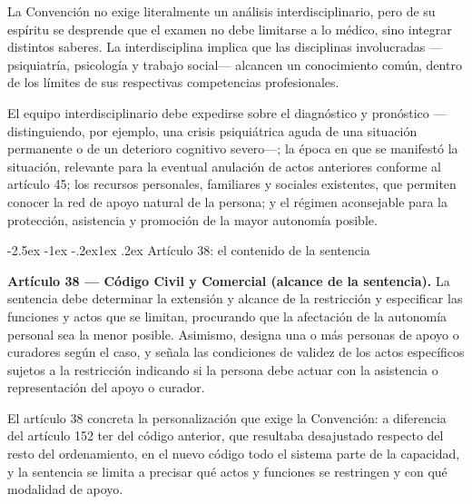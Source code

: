 \documentclass[12pt,oneside]{book}
\makeatletter
\renewcommand\subsection{\@startsection{subsection}{2}{\z@}%
  {-2.5ex \@plus -1ex \@minus -.2ex}{1ex \@plus .2ex}%
  {\normalfont\normalsize\bfseries}}
\makeatother
\begin{document}
La Convención no exige literalmente un análisis interdisciplinario, pero de su espíritu se desprende que el examen no debe limitarse a lo médico, sino integrar distintos saberes. La interdisciplina implica que las disciplinas involucradas ---psiquiatría, psicología y trabajo social--- alcancen un conocimiento común, dentro de los límites de sus respectivas competencias profesionales.


El equipo interdisciplinario debe expedirse sobre el diagnóstico y pronóstico ---distinguiendo, por ejemplo, una crisis psiquiátrica aguda de una situación permanente o de un deterioro cognitivo severo---; la época en que se manifestó la situación, relevante para la eventual anulación de actos anteriores conforme al artículo 45; los recursos personales, familiares y sociales existentes, que permiten conocer la red de apoyo natural de la persona; y el régimen aconsejable para la protección, asistencia y promoción de la mayor autonomía posible.

\subsection{Artículo 38: el contenido de la sentencia}

\begin{importante}
\textbf{Artículo 38 --- Código Civil y Comercial (alcance de la sentencia).} La sentencia debe determinar la extensión y alcance de la restricción y especificar las funciones y actos que se limitan, procurando que la afectación de la autonomía personal sea la menor posible. Asimismo, designa una o más personas de apoyo o curadores según el caso, y señala las condiciones de validez de los actos específicos sujetos a la restricción indicando si la persona debe actuar con la asistencia o representación del apoyo o curador.
\end{importante}

El artículo 38 concreta la personalización que exige la Convención: a diferencia del artículo 152 ter del código anterior, que resultaba desajustado respecto del resto del ordenamiento, en el nuevo código todo el sistema parte de la capacidad, y la sentencia se limita a precisar qué actos y funciones se restringen y con qué modalidad de apoyo.
\end{document}
